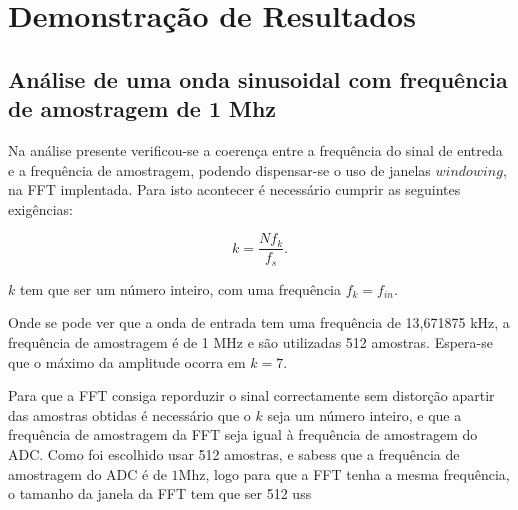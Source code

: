 \documentclass[11pt]{article}
\numberwithin{equation}{section}
\begin{document}
\section{Demonstração de Resultados}

\subsection{Análise de uma onda sinusoidal com frequência de amostragem de 1 Mhz}

	Na análise presente verificou-se a coerença entre a frequência do sinal de entreda e a frequência de amostragem, podendo dispensar-se o uso de janelas $windowing$, na FFT implentada.
	Para isto acontecer é necessário cumprir as seguintes exigências:
		
	\vspace{-3mm}
	\begin{equation}
			k = \frac{N f_{k}}{f_{s}}.
		\label{eq:max_bin}
	\end{equation}
		
	$k$ tem que ser um número inteiro, com uma frequência $f_{k} = f_{in}$.
	 
	 Onde se pode ver que a onda de entrada tem uma frequência de 13,671875 kHz, a frequência de amostragem é de 1 MHz e são utilizadas 512 amostras. Espera-se que o máximo da amplitude ocorra em $k = 7$.
	 
	 Para que a FFT consiga reporduzir o sinal correctamente sem distorção apartir das amostras obtidas é necessário que o $k$ seja um número inteiro, e que a frequência de amostragem da FFT seja igual à frequência de amostragem do ADC. Como foi escolhido usar 512 amostras, e sabess que a frequência de amostragem do ADC é de $1$Mhz, logo para que a FFT tenha a mesma frequência, o tamanho da janela da FFT tem que ser 512 uss
	 
	 
	 
		
	
\end{document}
